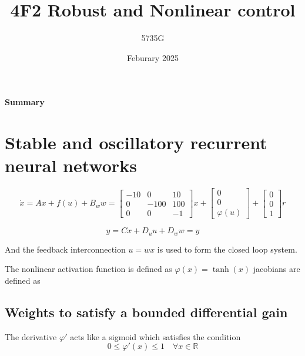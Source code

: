 \documentclass{article}
\begin{document}
\title{4F2 Robust and Nonlinear control}
\author{5735G}
\date{Feburary 2025}
\maketitle 

\begin{center}
    \textbf{Summary} \\
    
\end{center}

\section{Stable and oscillatory recurrent neural networks}

\begin{equation}
    \dot{x} = Ax + f(u) + B_w w = \begin{bmatrix}
        -10 & 0 & 10 \\
        0 & -100 & 100 \\
        0 & 0 & -1
    \end{bmatrix} x + \begin{bmatrix}
        0 \\ 0 \\ \varphi(u)
    \end{bmatrix} + \begin{bmatrix}
        0 \\ 0 \\ 1
    \end{bmatrix} r
\end{equation}

\begin{equation}
    y = Cx + D_u u + D_w w = y
\end{equation}

And the feedback interconnection $u = w x$ is used to form the closed loop system.

The nonlinear activation function is defined as $\varphi(x) = \tanh(x)$ jacobians are defined as

\subsection{Weights to satisfy a bounded differential gain}

The derivative $\varphi'$ acts like a sigmoid which satisfies the condition
\begin{equation}
    0 \leq \varphi'(x) \leq 1 \quad \forall x \in \mathbb{R}
\end{equation}
\end{document}
